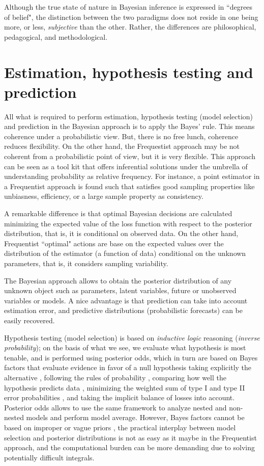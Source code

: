 Although the true state of nature in Bayesian inference is expressed in ``degrees of belief", the distinction between the two paradigms does not reside in one being more, or less, \textit{subjective} than the other. Rather, the differences are philosophical, pedagogical, and methodological.

\section{Estimation, hypothesis testing and prediction}\label{sec23}

All what is required to perform estimation, hypothesis testing (model selection) and prediction in the Bayesian approach is to apply the Bayes' rule. This means coherence under a probabilistic view. But, there is no free lunch, coherence reduces flexibility. On the other hand, the Frequestist approach may be not coherent from a probabilistic point of view, but it is very flexible. This approach can be seen as a tool kit that offers inferential solutions under the umbrella of understanding probability as relative frequency. For instance, a point estimator in a Frequentist approach is found such that satisfies good sampling properties like unbiasness, efficiency, or a large sample property as consistency.

A remarkable difference is that optimal Bayesian decisions are calculated minimizing the expected value of the loss function with respect to the posterior distribution, that is, it is conditional on observed data. On the other hand, Frequentist ``optimal" actions are base on the expected values over the distribution of the estimator (a function of data) conditional on the unknown parameters, that is, it considers sampling variability.

The Bayesian approach allows to obtain the posterior distribution of any unknown object such as parameters, latent variables, future or unobserved variables or models. A nice advantage is that prediction can take into account estimation error, and predictive distributions (probabilistic forecasts) can be easily recovered. 

Hypothesis testing (model selection) is based on \textit{inductive logic} reasoning (\textit{inverse probability}); on the basis of what we see, we evaluate what hypothesis is most tenable, and is performed using posterior odds, which in turn are based on Bayes factors that evaluate evidence in favor of a null hypothesis taking explicitly the alternative \cite{Kass1995}, following the rules of probability \cite{Lindley2000}, comparing how well the hypothesis predicts data \cite{Goodman1999}, minimizing the weighted sum of type I and type II error probabilities \cite{DeGroot1975,Pericchip}, and taking the implicit balance of losses \cite{Jeffreys1961,Bernardo1994} into account. Posterior odds allows to use the same framework to analyze nested and non-nested models and perform model average. However, Bayes factors cannot be based on improper or vague priors \cite{koop2003bayesian}, the practical interplay between model selection and posterior distributions is not as easy as it maybe in the Frequentist approach, and the computational burden can be more demanding due to solving potentially difficult integrals.


